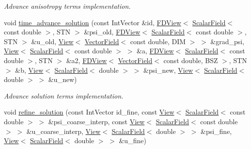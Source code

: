 \begin{DoxyCompactItemize}
\begin{DoxyCompactList}\small\item\em Advance anisotropy terms implementation. \end{DoxyCompactList}\item 
void \hyperlink{classUintah_1_1PhaseField_1_1PureMetal_aabaaf7d46c81a4ea360885d7abad7839}{time\+\_\+advance\+\_\+solution} (const Int\+Vector \&id, \hyperlink{namespaceUintah_1_1PhaseField_a63032464b1cd54eaa53c1c29109746ac}{F\+D\+View}$<$ \hyperlink{structUintah_1_1PhaseField_1_1ScalarField}{Scalar\+Field}$<$ const double $>$, S\+TN $>$ \&psi\+\_\+old, \hyperlink{namespaceUintah_1_1PhaseField_a63032464b1cd54eaa53c1c29109746ac}{F\+D\+View}$<$ \hyperlink{structUintah_1_1PhaseField_1_1ScalarField}{Scalar\+Field}$<$ const double $>$, S\+TN $>$ \&u\+\_\+old, \hyperlink{namespaceUintah_1_1PhaseField_a59210a1e28eba254d428762c92ddeabb}{View}$<$ \hyperlink{structUintah_1_1PhaseField_1_1VectorField}{Vector\+Field}$<$ const double, D\+IM $>$ $>$ \&grad\+\_\+psi, \hyperlink{namespaceUintah_1_1PhaseField_a59210a1e28eba254d428762c92ddeabb}{View}$<$ \hyperlink{structUintah_1_1PhaseField_1_1ScalarField}{Scalar\+Field}$<$ const double $>$ $>$ \&a, \hyperlink{namespaceUintah_1_1PhaseField_a63032464b1cd54eaa53c1c29109746ac}{F\+D\+View}$<$ \hyperlink{structUintah_1_1PhaseField_1_1ScalarField}{Scalar\+Field}$<$ const double $>$, S\+TN $>$ \&a2, \hyperlink{namespaceUintah_1_1PhaseField_a63032464b1cd54eaa53c1c29109746ac}{F\+D\+View}$<$ \hyperlink{structUintah_1_1PhaseField_1_1VectorField}{Vector\+Field}$<$ const double, B\+SZ $>$, S\+TN $>$ \&b, \hyperlink{namespaceUintah_1_1PhaseField_a59210a1e28eba254d428762c92ddeabb}{View}$<$ \hyperlink{structUintah_1_1PhaseField_1_1ScalarField}{Scalar\+Field}$<$ double $>$ $>$ \&psi\+\_\+new, \hyperlink{namespaceUintah_1_1PhaseField_a59210a1e28eba254d428762c92ddeabb}{View}$<$ \hyperlink{structUintah_1_1PhaseField_1_1ScalarField}{Scalar\+Field}$<$ double $>$ $>$ \&u\+\_\+new)
\begin{DoxyCompactList}\small\item\em Advance solution terms implementation. \end{DoxyCompactList}\item 
void \hyperlink{classUintah_1_1PhaseField_1_1PureMetal_a4e7d985a88caf7f0300e8c16f66da400}{refine\+\_\+solution} (const Int\+Vector id\+\_\+fine, const \hyperlink{namespaceUintah_1_1PhaseField_a59210a1e28eba254d428762c92ddeabb}{View}$<$ \hyperlink{structUintah_1_1PhaseField_1_1ScalarField}{Scalar\+Field}$<$ const double $>$ $>$ \&psi\+\_\+coarse\+\_\+interp, const \hyperlink{namespaceUintah_1_1PhaseField_a59210a1e28eba254d428762c92ddeabb}{View}$<$ \hyperlink{structUintah_1_1PhaseField_1_1ScalarField}{Scalar\+Field}$<$ const double $>$ $>$ \&u\+\_\+coarse\+\_\+interp, \hyperlink{namespaceUintah_1_1PhaseField_a59210a1e28eba254d428762c92ddeabb}{View}$<$ \hyperlink{structUintah_1_1PhaseField_1_1ScalarField}{Scalar\+Field}$<$ double $>$ $>$ \&psi\+\_\+fine, \hyperlink{namespaceUintah_1_1PhaseField_a59210a1e28eba254d428762c92ddeabb}{View}$<$ \hyperlink{structUintah_1_1PhaseField_1_1ScalarField}{Scalar\+Field}$<$ double $>$ $>$ \&u\+\_\+fine)

\end{DoxyCompactItemize}
